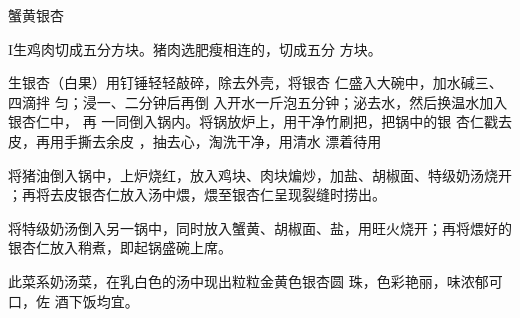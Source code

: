 \begin{recipe}{蟹黄银杏}

\ingredients



\preparation

I生鸡肉切成五分方块。猪肉选肥瘦相连的，切成五分 方块。

生银杏（白果）用钉锤轻轻敲碎，除去外壳，将银杏 仁盛入大碗中，加水碱三、四滴拌
匀；浸一、二分钟后再倒 入开水一斤泡五分钟；泌去水，然后换温水加入银杏仁中， 再
一同倒入锅内。将锅放炉上，用干净竹刷把，把锅中的银 杏仁戳去皮，再用手撕去余皮
，抽去心，淘洗干净，用清水 漂着待用

\step 将猪油倒入锅中，上炉烧红，放入鸡块、肉块煸炒，加盐、胡椒面、特级奶汤烧开
；再将去皮银杏仁放入汤中煨，煨至银杏仁呈现裂缝时捞出。

\step 将特级奶汤倒入另一锅中，同时放入蟹黄、胡椒面、盐，用旺火烧开；再将煨好的
银杏仁放入稍煮，即起锅盛碗上席。

\features

此菜系奶汤菜，在乳白色的汤中现出粒粒金黄色银杏圆 珠，色彩艳丽，味浓郁可口，佐
酒下饭均宜。

\end{recipe}

